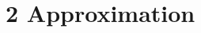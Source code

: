\begin{abstract}

\end{abstract}
% 
% 
% 
% 	
% 	
% 
% 
% 
% 
% 
% 
% 
% 
% 
% 
% 
% 

\section{2 Approximation}
